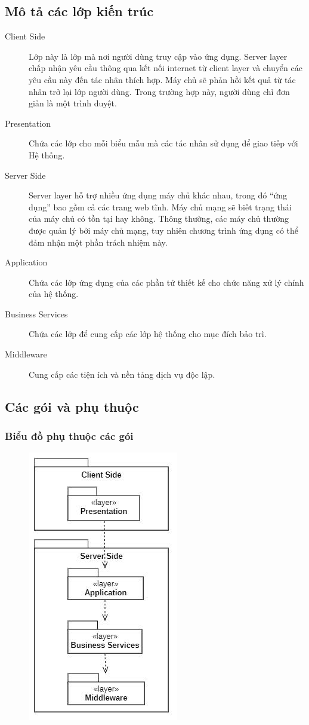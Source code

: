 \documentclass[./../main.tex]{subfiles}
\begin{document}
	\subsection{Mô tả các lớp kiến trúc}
	\begin{description}
		\item[Client Side] Lớp này là lớp mà nơi người dùng truy cập vào ứng dụng. Server layer chấp nhận yêu cầu thông qua kết nối internet từ client layer và chuyển các yêu cầu này đến tác nhân thích hợp. Máy chủ sẽ phản hồi kết quả từ tác nhân trở lại lớp người dùng. Trong trường hợp này, người dùng chỉ đơn giản là một trình duyệt.
		\item[Presentation] Chứa các lớp cho mỗi biểu mẫu mà các tác nhân sử dụng để giao tiếp với Hệ thống.
		\item[Server Side] Server layer hỗ trợ nhiều ứng dụng máy chủ khác nhau, trong đó “ứng dụng” bao gồm cả các trang web tĩnh. Máy chủ mạng sẽ biết trạng thái của máy chủ có tồn tại hay không. Thông thường, các máy chủ thường được quản lý bởi máy chủ mạng, tuy nhiên chương trình ứng dụng có thể đảm nhận một phần trách nhiệm này.
		\item[Application] Chứa các lớp ứng dụng của các phần tử thiết kế cho chức năng xử lý chính của hệ thống.
		\item[Business Services] Chứa các lớp để cung cấp các lớp hệ thống cho mục đích bảo trì.
		\item[Middleware] Cung cấp các tiện ích và nền tảng dịch vụ độc lập.
		
	\end{description}
	\subsection{Các gói và phụ thuộc}
	\subsubsection{Biểu đồ phụ thuộc các gói}
	\begin{figure}[H]
		\centering
		\includegraphics{./images/layer_and_dependencies.png}
	\end{figure}
\end{document}
